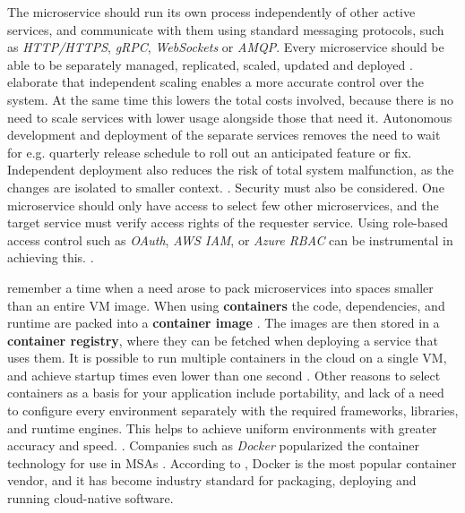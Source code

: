 \documentclass[utf8,english]{gradu3}
\begin{document}
The microservice should run its own process independently of other active
services, and communicate with them using standard messaging protocols, such as
\textit{HTTP/HTTPS}, \textit{gRPC}, \textit{WebSockets} or \textit{AMQP}. Every
microservice should be able to be separately managed, replicated, scaled,
updated and deployed \parencite[18]{Gannon2017}. \textcite{Microsoft2022-CNA}
elaborate that independent scaling enables a more accurate control over the
system. At the same time this lowers the total costs involved, because there is
no need to scale services with lower usage alongside those that need it.
Autonomous development and deployment of the separate services removes the need to wait for e.g.
quarterly release schedule to roll out an anticipated feature or fix.
Independent deployment also reduces the risk of total system malfunction, as the
changes are isolated to smaller context. \parencite{Microsoft2022-CNA}. Security
must also be considered. One microservice should only have access to select few
other microservices, and the target service must verify access rights of the
requester service. Using role-based access control such as \textit{OAuth},
\textit{AWS IAM}, or \textit{Azure RBAC} can be instrumental in achieving this.
\parencite[18]{Gannon2017}.

\textcite[18]{Gannon2017} remember a time when a need arose to pack microservices
into spaces smaller than an entire VM image. When using
\textbf{containers} the code, dependencies, and runtime are packed into a
\textbf{container image} \parencite{Microsoft2022-CNA}. The images are then stored
in a \textbf{container registry}, where they can be fetched when deploying a
service that uses them. It is possible to run multiple containers in the cloud
on a single VM, and achieve startup times even lower than one second
\parencite[18]{Gannon2017}. Other reasons to select containers as a basis for
your application include portability, and lack of a need to configure every
environment separately with the required frameworks, libraries, and runtime
engines. This helps to achieve uniform environments with greater accuracy and
speed. \parencite{Microsoft2022-CNA}. Companies such as \textit{Docker} popularized
the container technology for use in MSAs \parencite[18]{Gannon2017}. According
to \textcite{Microsoft2022-CNA}, Docker is the most popular container vendor, and it
has become industry standard for packaging, deploying and running cloud-native
software.
\end{document}
